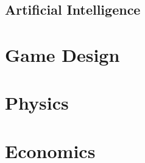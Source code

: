 \documentclass{article}
\begin{document}
\subsection{Artificial Intelligence}


\section{Game Design}

\section{Physics}

\section{Economics}
\end{document}
